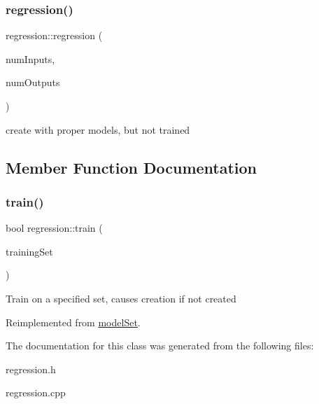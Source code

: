 \subsubsection{\texorpdfstring{regression()}{regression()}\hspace{0.1cm}{\footnotesize\ttfamily [3/3]}}
{\footnotesize\ttfamily regression\+::regression (\begin{DoxyParamCaption}\item[{int}]{num\+Inputs,  }\item[{int}]{num\+Outputs }\end{DoxyParamCaption})}

create with proper models, but not trained 

\subsection{Member Function Documentation}
\mbox{\label{classregression_ae45d7dbf24cab75202d966d116829813}} 
\subsubsection{\texorpdfstring{train()}{train()}}
{\footnotesize\ttfamily bool regression\+::train (\begin{DoxyParamCaption}\item[{std\+::vector$<$ \hyperlink{structtraining_example}{training\+Example} $>$}]{training\+Set }\end{DoxyParamCaption})\hspace{0.3cm}{\ttfamily [virtual]}}

Train on a specified set, causes creation if not created 

Reimplemented from \hyperlink{classmodel_set_ab0b16ec988c8077158de1c3d8986df03}{model\+Set}.



The documentation for this class was generated from the following files\+:\begin{DoxyCompactItemize}
\item 
regression.\+h\item 
regression.\+cpp\end{DoxyCompactItemize}

